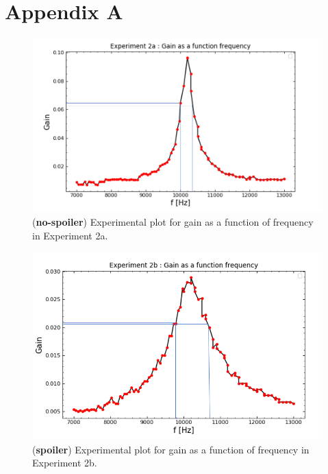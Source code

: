 \documentclass[
	12pt,
	]{article}
\theoremstyle{definition}
\theoremstyle{definition}
\theoremstyle{definition}
\theoremstyle{definition}
\theoremstyle{definition}
\theoremstyle{example}
\theoremstyle{note}
\theoremstyle{remark}
\theoremstyle{example}
\begin{document}
		\section*{Appendix A }
		\begin{figure}[H]
										\centering
										\includegraphics[width = 0.8\linewidth]{PHYS241_Lab4_Exp2.png}
										\captionsetup{margin=1cm}
										\caption{(\textbf{no-spoiler}) Experimental plot for gain as a function of frequency in Experiment 2a.}
									\end{figure} 
				\begin{figure}[H]
										\centering
										\includegraphics[width = 0.8\linewidth]{PHYS241_Lab4_Exp2b.png}
										\captionsetup{margin=1cm}
										\caption{(\textbf{spoiler}) Experimental plot for gain as a function of frequency in Experiment 2b.}
									\end{figure} 
		\newpage 
\end{document}
